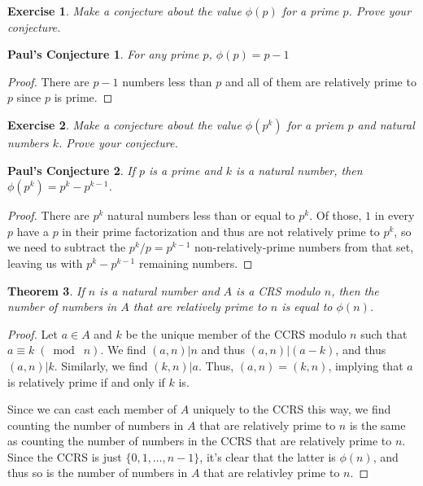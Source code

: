 \documentclass{article}
\newtheorem{thm}{Theorem}[section]
\newtheorem{ex}[thm]{Exercise}
\newtheorem{PC}{Paul's Conjecture}
\numberwithin{equation}{thm}
\providecommand{\gmod}[1]{\; (\bmod \; #1)}
\begin{document}
\begin{ex} \label{6.18}
  Make a conjecture about the value $\phi(p)$ for a prime $p$. Prove your conjecture.
\end{ex}

\begin{PC} \label{PC 6.18}
  For any prime $p$, $\phi(p) = p-1$
\end{PC}

\begin{proof}
  There are $p-1$ numbers less than $p$ and all of them are relatively prime to $p$ since $p$ is prime.
\end{proof}



\begin{ex} \label{6.19}
  Make a conjecture about the value $\phi(p^k)$ for a priem $p$ and natural numbers $k$. Prove your conjecture.
\end{ex}

\begin{PC} \label{PC 6.19}
  If $p$ is a prime and $k$ is a natural number, then $\phi(p^k) = p^k - p^{k-1}$.
\end{PC}

\begin{proof}
  There are $p^k$ natural numbers less than or equal to $p^k$. Of those, $1$ in every $p$ have a $p$ in their prime factorization and thus are not relatively prime to $p^k$, so we need to subtract the $p^k / p = p^{k-1}$ non-relatively-prime numbers from that set, leaving us with $p^k - p^{k-1}$ remaining numbers.
\end{proof}



\begin{thm} \label{5.20}
  If $n$ is a natural number and $A$ is a CRS modulo $n$, then the number of numbers in $A$ that are relatively prime to $n$ is equal to $\phi(n)$.
\end{thm}

\begin{proof}
  Let $a \in A$ and $k$ be the unique member of the CCRS modulo $n$ such that $a \equiv k \gmod n$. We find $(a, n) | n$ and thus $(a, n) | (a - k)$, and thus $(a, n) | k$. Similarly, we find $(k, n) | a$. Thus, $(a, n) = (k, n)$, implying that $a$ is relatively prime if and only if $k$ is.

  Since we can cast each member of $A$ uniquely to the CCRS this way, we find counting the number of numbers in $A$ that are relatively prime to $n$ is the same as counting the number of numbers in the CCRS that are relatively prime to $n$. Since the CCRS is just $\{0, 1, \ldots, n-1\}$, it's clear that the latter is $\phi(n)$, and thus so is the number of numbers in $A$ that are relativley prime to $n$.
\end{proof}
\end{document}
